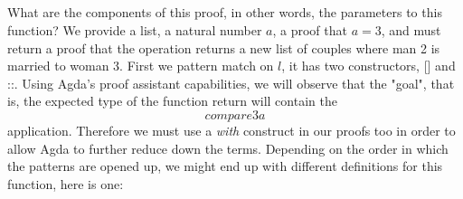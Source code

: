 {\begin{code}%
\>[0]\<%
\\
\>[0]\<%
\\
\>[0]\<%
\\
\>[0]\AgdaSpace{}%
\AgdaSymbol{:}%
\>[461I]\AgdaSymbol{(}\AgdaSpace{}%
\AgdaSymbol{:}\AgdaSpace{}%
\AgdaSpace{}%
\AgdaSymbol{(}\AgdaSpace{}%
\AgdaSpace{}%
\AgdaSymbol{))(}\AgdaSpace{}%
\AgdaSymbol{:}\AgdaSpace{}%
\AgdaSymbol{)}\AgdaSpace{}%
\AgdaSpace{}%
\AgdaSpace{}%
\AgdaSpace{}%
\AgdaSpace{}%
\<%
\\
\>[.][@{}l@{}]\<[461I]%
\>[4]\AgdaSpace{}%
\AgdaSymbol{(}\AgdaSpace{}%
\AgdaOperator{\AgdaInductiveConstructor{,}}\AgdaSpace{}%
\AgdaSymbol{)}\AgdaSpace{}%
\AgdaSymbol{((}\AgdaSpace{}%
\AgdaOperator{\AgdaInductiveConstructor{,}}\AgdaSpace{}%
\AgdaSymbol{)}\AgdaSpace{}%
\AgdaSpace{}%
\AgdaSymbol{)}\AgdaSpace{}%
\AgdaSpace{}%
\AgdaSymbol{((}\AgdaSpace{}%
\AgdaOperator{\AgdaInductiveConstructor{,}}\AgdaSpace{}%
\AgdaSymbol{)}\AgdaSpace{}%
\AgdaSpace{}%
\AgdaSymbol{)}\<%
\end{code}

What are the components of this proof, in other words, the parameters to this function? We provide a list, a natural number $a$, a proof that $a = 3$, and must return a proof that the operation returns a new list of couples where man 2 is married to woman 3. First we pattern match on $l$, it has two constructors, [] and \:::. Using Agda's proof assistant capabilities, we will observe that the "goal", that is, the expected type of the function return will contain the $$compare 3 a$$ application. Therefore we must use a \emph{with} construct in our proofs too in order to allow Agda to further reduce down the terms. Depending on the order in which the patterns are opened up, we might end up with different definitions for this function, here is one:

}
